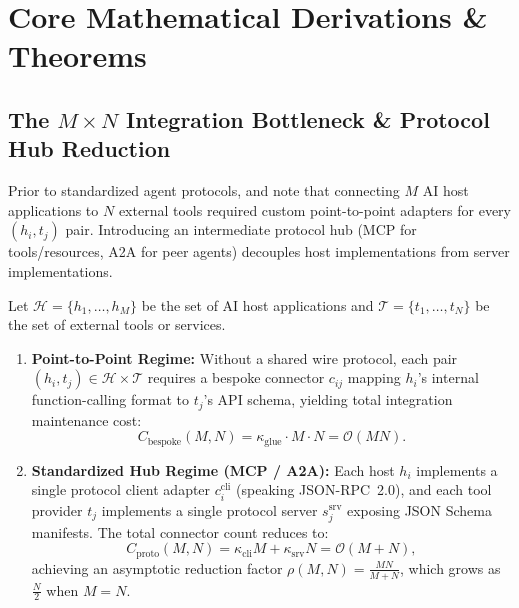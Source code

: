 \documentclass[../../../../master.tex]{subfiles}
\begin{document}
\section{Core Mathematical Derivations \& Theorems}
\label{sec:mcp:theory}

\subsection{The \texorpdfstring{$M \times N$}{M x N} Integration Bottleneck \& Protocol Hub Reduction}

Prior to standardized agent protocols,  and  note that connecting $M$ AI host applications to $N$ external tools required custom point-to-point adapters for every $(h_i, t_j)$ pair. Introducing an intermediate protocol hub (MCP for tools/resources, A2A for peer agents) decouples host implementations from server implementations.

\begin{coremath}
Let $\mathcal{H} = \{h_1, \dots, h_M\}$ be the set of AI host applications and $\mathcal{T} = \{t_1, \dots, t_N\}$ be the set of external tools or services.
\begin{enumerate}
  \item \textbf{Point-to-Point Regime:} Without a shared wire protocol, each pair $(h_i, t_j) \in \mathcal{H} \times \mathcal{T}$ requires a bespoke connector $c_{ij}$ mapping $h_i$'s internal function-calling format to $t_j$'s API schema, yielding total integration maintenance cost:
  \begin{equation}
    C_{\text{bespoke}}(M, N) = \kappa_{\text{glue}} \cdot M \cdot N = \mathcal{O}(M N).
    \label{eq:mcp:mn_cost}
  \end{equation}
  \item \textbf{Standardized Hub Regime (MCP / A2A):} Each host $h_i$ implements a single protocol client adapter $c^{\text{cli}}_i$ (speaking JSON-RPC~2.0), and each tool provider $t_j$ implements a single protocol server $s^{\text{srv}}_j$ exposing JSON Schema manifests. The total connector count reduces to:
  \begin{equation}
    C_{\text{proto}}(M, N) = \kappa_{\text{cli}} M + \kappa_{\text{srv}} N = \mathcal{O}(M + N),
    \label{eq:mcp:m_plus_n_cost}
  \end{equation}
  achieving an asymptotic reduction factor $\rho(M, N) = \frac{MN}{M + N}$, which grows as $\frac{N}{2}$ when $M = N$.
\end{enumerate}
\end{coremath}
\end{document}
